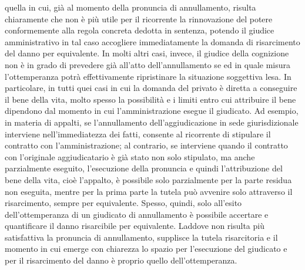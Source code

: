 \documentclass[12pt,it,a4paper,]{report}
\begin{document}
quella in cui, già al momento della pronuncia di annullamento, risulta
chiaramente che non è più utile per il ricorrente la rinnovazione del
potere conformemente alla regola concreta dedotta in sentenza, potendo
il giudice amministrativo in tal caso accogliere immediatamente la
domanda di risarcimento del danno per equivalente. In molti altri casi,
invece, il giudice della cognizione non è in grado di prevedere già
all'atto dell'annullamento se ed in quale misura l'ottemperanza potrà
effettivamente ripristinare la situazione soggettiva lesa. In
particolare, in tutti quei casi in cui la domanda del privato è diretta
a conseguire il bene della vita, molto spesso la possibilità e i limiti
entro cui attribuire il bene dipendono dal momento in cui
l'amministrazione esegue il giudicato. Ad esempio, in materia di
appalti, se l'annullamento dell'aggiudicazione in sede giurisdizionale
interviene nell'immediatezza dei fatti, consente al ricorrente di
stipulare il contratto con l'amministrazione; al contrario, se
interviene quando il contratto con l'originale aggiudicatario è già
stato non solo stipulato, ma anche parzialmente eseguito, l'esecuzione
della pronuncia e quindi l'attribuzione del bene della vita, cioè
l'appalto, è possibile solo parzialmente per la parte residua non
eseguita, mentre per la prima parte la tutela può avvenire solo
attraverso il risarcimento, sempre per equivalente. Spesso, quindi, solo
all'esito dell'ottemperanza di un giudicato di annullamento è possibile
accertare e quantificare il danno risarcibile per equivalente. Laddove
non risulta più satisfattiva la pronuncia di annullamento, supplisce la
tutela risarcitoria e il momento in cui emerge con chiarezza lo spazio
per l'esecuzione del giudicato e per il risarcimento del danno è proprio
quello dell'ottemperanza.
\end{document}
